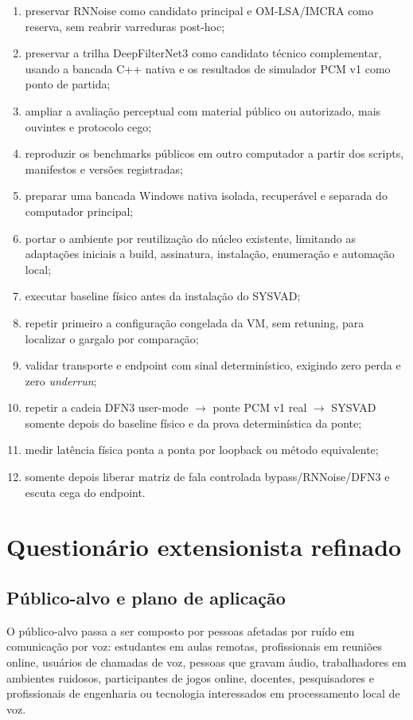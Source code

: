 \begin{enumerate}
    \item preservar RNNoise como candidato principal e OM-LSA/IMCRA como reserva, sem reabrir varreduras post-hoc;
    \item preservar a trilha DeepFilterNet3 como candidato técnico complementar, usando a bancada C++ nativa e os resultados de simulador PCM v1 como ponto de partida;
    \item ampliar a avaliação perceptual com material público ou autorizado, mais ouvintes e protocolo cego;
    \item reproduzir os benchmarks públicos em outro computador a partir dos scripts, manifestos e versões registradas;
    \item preparar uma bancada Windows nativa isolada, recuperável e separada do computador principal;
    \item portar o ambiente por reutilização do núcleo existente, limitando as adaptações iniciais a build, assinatura, instalação, enumeração e automação local;
    \item executar baseline físico antes da instalação do SYSVAD;
    \item repetir primeiro a configuração congelada da VM, sem retuning, para localizar o gargalo por comparação;
    \item validar transporte e endpoint com sinal determinístico, exigindo zero perda e zero \textit{underrun};
    \item repetir a cadeia DFN3 user-mode \(\rightarrow\) ponte PCM v1 real \(\rightarrow\) SYSVAD somente depois do baseline físico e da prova determinística da ponte;
    \item medir latência física ponta a ponta por loopback ou método equivalente;
    \item somente depois liberar matriz de fala controlada bypass/RNNoise/DFN3 e escuta cega do endpoint.
\end{enumerate}

\section{Questionário extensionista refinado}

\subsection{Público-alvo e plano de aplicação}

O público-alvo passa a ser composto por pessoas afetadas por ruído em comunicação por voz: estudantes em aulas remotas, profissionais em reuniões online, usuários de chamadas de voz, pessoas que gravam áudio, trabalhadores em ambientes ruidosos, participantes de jogos online, docentes, pesquisadores e profissionais de engenharia ou tecnologia interessados em processamento local de voz.

